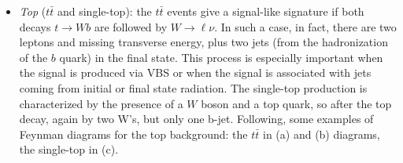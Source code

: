 \begin{itemize}
\item \textit{Top} ($t\bar{t}$ and single-top): the $t\bar{t}$ events give a signal-like signature if both decays $t \to Wb$ are followed by $W \to \ell \nu$.  In such a case, in fact, there are two leptons and missing transverse energy,  plus two jets (from the hadronization of the $b$ quark) in the final state. This process is especially important when the signal is produced via VBS or when the signal is associated with jets coming from initial or final state radiation. The single-top production is characterized by the presence of a $W$ boson and a top quark, so after the top decay, again by two W's, but only one b-jet. Following, some examples of Feynman diagrams for the top background: the $t\bar{t}$ in (a) and (b) diagrams, the single-top in (c).
\begin{figure}[h]
\centering%
 \qquad 
{} \qquad 

\end{figure}
\end{itemize}
